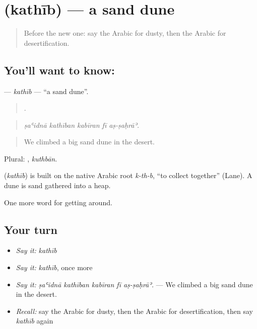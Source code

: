 \section[\texorpdfstring{\ar{كثيب} (kathīb)}{كثيب (kathīb)}]{ (kathīb) — a sand dune}

\label{lesson:AR-C466-kathib}



\begin{quote}
Before the new one: say the Arabic for dusty, then the Arabic for desertification.
\end{quote}

\subsection*{You'll want to know: }
\textbf{} — \emph{kathīb} — \textquotedblleft{}a sand dune\textquotedblright{}.

\begin{quote}
    .
\end{quote}

\begin{quote}
\emph{ṣaʿidnā kathīban kabīran fī aṣ-ṣaḥrāʾ.}
\end{quote}

\begin{quote}
We climbed a big sand dune in the desert.
\end{quote}

Plural: , \emph{kuthbān}.

\begin{cousinweb}
\textbf{} (\emph{kathīb}) is built on the native Arabic root \emph{k-th-b}, \textquotedblleft{}to collect together\textquotedblright{} (Lane). A dune is sand gathered into a heap.
\end{cousinweb}

\begin{grammarlens}[title={What you've built}]
One more word for getting around.
\end{grammarlens}

\subsection*{Your turn}
\begin{itemize}
\raggedright
  \item \emph{Say it:} \emph{kathīb}
  \item \emph{Say it:} \emph{kathīb}, once more
  \item \emph{Say it:} \emph{ṣaʿidnā kathīban kabīran fī aṣ-ṣaḥrāʾ.} — We climbed a big sand dune in the desert.
  \item \emph{Recall:} say the Arabic for dusty, then the Arabic for desertification, then say \emph{kathīb} again
\end{itemize}

